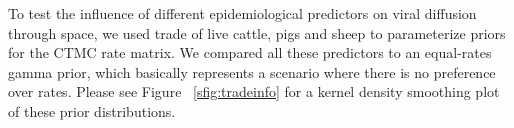 \documentclass[10pt]{article}
\begin{document}
To test the influence of different epidemiological predictors on viral diffusion through space, we used trade of live cattle, pigs and sheep to parameterize priors for the CTMC rate matrix.
We compared all these  predictors to an equal-rates  gamma prior, which basically represents a scenario where there is no preference over rates.
Please see Figure ~\ref{sfig:tradeinfo} for a kernel density smoothing plot of these prior distributions.
\end{document}
